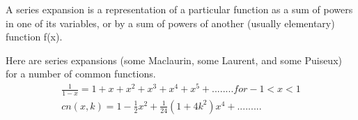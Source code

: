 \newpage

	A series expansion is a representation of a particular function as a sum of powers in one of its variables, or by a sum of powers of another (usually elementary) function  f(x).
	
	Here are series expansions (some Maclaurin, some Laurent, and some Puiseux) for a number of common functions.
		\begin{align}
		\frac{1}{1-x}=1+x+x^{2}+x^{3}+x^{4}+x^{5}+........for -1<x<1 \\
		cn(x,k)=1-\frac{1}{2}x^{2}+\frac{1}{24}(1+4k^{2})x^{4}+.........\\
		\end{align}
